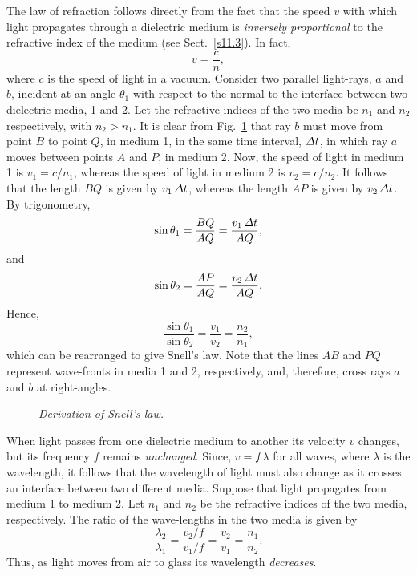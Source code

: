 The law of refraction follows directly from  the fact that
the speed $v$ with which  light propagates through a dielectric medium 
is {\em inversely proportional} to the refractive index of the
medium (see Sect.~\ref{s11.3}). In fact, 
\begin{equation}
v  =\frac{c}{n},
\end{equation}
where $c$ is the speed of light in a vacuum. Consider two
parallel light-rays, $a$ and $b$, incident at an angle $\theta_1$ with
respect to the normal to the interface between two dielectric media,
1 and 2. Let the refractive indices of the two media be $n_1$ and
$n_2$ respectively, with $n_2>n_1$. It is clear from Fig.~\ref{f12.6}
that ray $b$ must move from  point
$B$ to point $Q$, in medium 1, in the same time interval,
 ${\mit\Delta} t$, in which
ray $a$ moves between points $A$ and $P$, in medium 2. Now, the
speed of light in medium 1 is $v_1=c/n_1$, whereas the speed
of light in medium 2 is $v_2=c/n_2$. It follows that the
length $BQ$ is given by $v_1\,{\mit\Delta} t$, whereas the
length $AP$ is given by $v_2\,{\mit\Delta} t$. By trigonometry,
\begin{equation}
\sin\theta_1 = \frac{BQ}{AQ} = \frac{v_1\,{\mit\Delta} t}{AQ},
\end{equation}
and
\begin{equation}
\sin\theta_2 = \frac{AP}{AQ} = \frac{ v_2\,{\mit\Delta} t}{AQ}.
\end{equation}
Hence,
\begin{equation}
\frac{\sin\theta_1}{\sin\theta_2} = \frac{v_1}{v_2} = \frac{n_2}{n_1},
\end{equation}
which can be rearranged to give  Snell's law. Note that the
lines $AB$ and $PQ$ represent wave-fronts in media 1 and 2, respectively, and,
therefore, cross rays $a$ and $b$ at right-angles. 

\begin{figure}
\epsfysize=3.5in
\centerline{}
\caption{\em Derivation of Snell's law.}\label{f12.6}
\end{figure}

When  light passes from one dielectric medium to another
its velocity $v$ changes, but its frequency $f$ remains {\em unchanged}.
Since, $v=f\,\lambda$ for all waves, where $\lambda$ is the wavelength,
it follows that the wavelength of light must also change as it crosses
an interface between two different media. 
Suppose that light propagates
 from medium 1 to medium 2. Let $n_1$ and $n_2$ be the refractive
indices of the two media, respectively. The ratio of the
wave-lengths in the two media is given by
\begin{equation}
\frac{\lambda_2}{\lambda_1} = \frac{v_2/f}{v_1/f} = 
\frac{v_2}{v_1}=\frac{n_1}{n_2}.
\end{equation}
Thus, as light moves from  air to glass its
wavelength {\em decreases}. 

